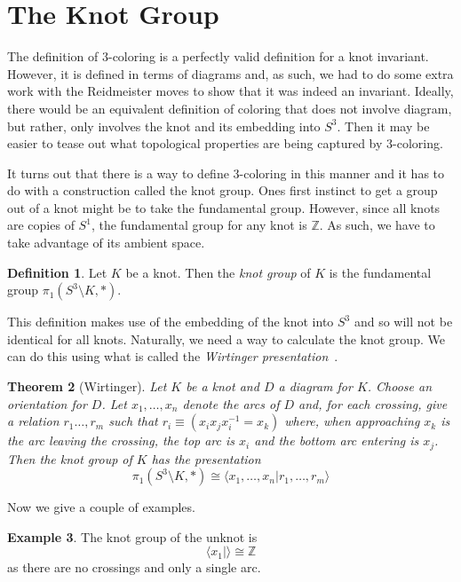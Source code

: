 \documentclass[12pt]{amsart}
\newtheorem{theorem}{Theorem}[section]
\theoremstyle{definition}
\newtheorem{definition}[theorem]{Definition}
\newtheorem{example}[theorem]{Example}
\theoremstyle{remark}
\numberwithin{equation}{section}
\newcommand{\bb}[1]{\mathbb{#1}}
\begin{document}
\section{The Knot Group}
\label{sec:knot-group-d_6}

The definition of $3$-coloring is a perfectly valid definition for a knot
invariant. However, it is defined in terms of diagrams and, as such,
we had to do some extra work with the Reidmeister moves to show that it
was indeed an invariant. Ideally, there would be an equivalent definition
of coloring that does not involve diagram, but rather, only involves
the knot and its embedding into $S^3$. Then it may be easier to tease
out what topological properties are being captured by $3$-coloring.

It turns out that there is a way to define $3$-coloring in this manner
and it has to do with a construction called the knot group. Ones first
instinct to get a group out of a knot might be to take the fundamental
group. However, since all knots are copies of $S^1$, the fundamental group
for any knot is $\bb{Z}$. As such, we have to take advantage of its
ambient space.

\begin{definition}
  Let $K$ be a knot. Then the \textit{knot group} of $K$ is the fundamental
  group $\pi_1(S^3\setminus K,*)$.
\end{definition}

This definition makes use of the embedding of the knot into $S^3$ and
so will not be identical for all knots. Naturally, we need a way
to calculate the knot group. We can do this using what is called
the \textit{Wirtinger presentation}~\cite{hatcher}.

\begin{theorem}[Wirtinger]
  Let $K$ be a knot and $D$ a diagram for $K$. Choose an
  orientation for $D$. Let $x_1,\ldots,x_n$
  denote the arcs of $D$ and, for each crossing, give a relation
  $r_1\ldots, r_m$ such that $r_i \equiv (x_ix_jx_i^{-1}=x_k)$ where, when approaching
  $x_k$ is the arc leaving the crossing, the top arc is $x_i$ and the bottom
  arc entering is $x_j$. Then the knot group of $K$ has the presentation
  \[
    \pi_1(S^3\setminus K,*)\cong \langle x_1,\ldots, x_n| r_1,\ldots,r_m\rangle
  \]
\end{theorem}

Now we give a couple of examples.

\begin{example}
  The knot group of the unknot is
  \[
    \langle x_1 |\rangle \cong \bb{Z}
  \]
  as there are no crossings and only a single arc.
\end{example}
\end{document}
